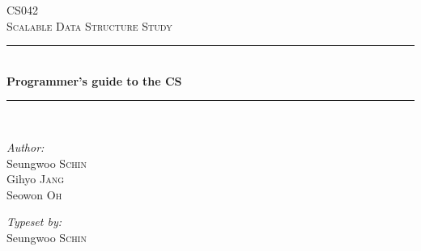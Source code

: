 \documentclass[twoside]{article}
\begin{document}
\begin{titlepage}

\newcommand{\HRule}{\rule{\linewidth}{0.5mm}} %

\center %
 

\vspace*{3cm}
\textsc{\Large CS042}\\[0.5cm] %
\textsc{\large Scalable Data Structure Study}\\[0.5cm] %


\HRule \\[0.4cm]
{ \huge \bfseries Programmer's guide to the CS}\\[0.4cm] %
\HRule \\[1.5cm]
 

\begin{minipage}{0.4\textwidth}
\begin{flushleft} \large
\emph{Author:}\\
Seungwoo \textsc{Schin} \\ %
Gihyo \textsc{Jang} \\ %
Seowon \textsc{Oh} %
\end{flushleft}
\end{minipage}
\begin{minipage}{0.4\textwidth}
\begin{flushright} \large
\emph{Typeset by:} \\
Seungwoo \textsc{Schin} %
\end{flushright}
\end{minipage}\\[4cm]


\end{titlepage}
\end{document}
